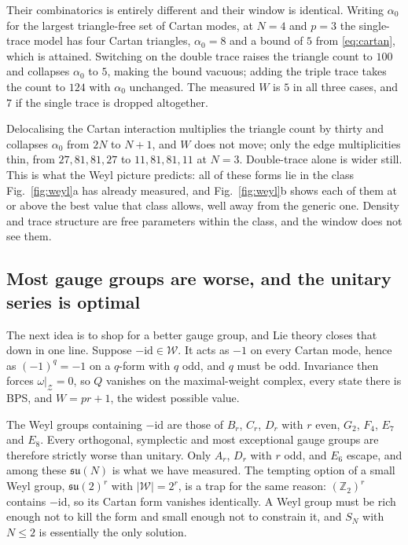\documentclass[10pt]{article}
\newcommand{\su}{\mathfrak{su}}
\newcommand{\Wg}{\mathcal{W}}
\begin{document}
Their combinatorics is entirely different and their window is identical. Writing $\alpha_0$ for the largest
triangle-free set of Cartan modes, at $N=4$ and $p=3$ the single-trace model has four Cartan triangles,
$\alpha_0=8$ and a bound of $5$ from \eqref{eq:cartan}, which is attained. Switching on the double trace raises
the triangle count to $100$ and collapses $\alpha_0$ to $5$, making the bound vacuous; adding the triple trace
takes the count to $124$ with $\alpha_0$ unchanged. The measured $W$ is $5$ in all three cases, and $7$ if the
single trace is dropped altogether.

Delocalising the Cartan interaction multiplies the triangle count by thirty and collapses $\alpha_0$ from $2N$
to $N+1$, and $W$ does not move; only the edge multiplicities thin, from $27,81,81,27$ to $11,81,81,11$ at $N=3$.
Double-trace alone is wider still. This is what the Weyl picture predicts: all of these forms lie in the class
Fig.~\ref{fig:weyl}a has already measured, and Fig.~\ref{fig:weyl}b shows each of them at or above the best value
that class allows, well away from the generic one. Density and trace structure are free parameters within the
class, and the window does not see them.

\subsection{Most gauge groups are worse, and the unitary series is optimal}

The next idea is to shop for a better gauge group, and Lie theory closes that down in one line. Suppose
$-\mathrm{id}\in\Wg$. It acts as $-1$ on every Cartan mode, hence as $(-1)^q=-1$ on a $q$-form with $q$ odd, and
$q$ must be odd. Invariance then forces $\omega|_{\mathcal Z}=0$, so $Q$ vanishes on the maximal-weight complex,
every state there is BPS, and $W=pr+1$, the widest possible value.

The Weyl groups containing $-\mathrm{id}$ are those of $B_r$, $C_r$, $D_r$ with $r$ even, $G_2$, $F_4$, $E_7$ and
$E_8$. Every orthogonal, symplectic and most exceptional gauge groups are therefore strictly worse than unitary.
Only $A_r$, $D_r$ with $r$ odd, and $E_6$ escape, and among these $\su(N)$ is what we have measured. The tempting
option of a small Weyl group, $\su(2)^r$ with $|\Wg|=2^r$, is a trap for the same reason: $(\mathbb Z_2)^r$
contains $-\mathrm{id}$, so its Cartan form vanishes identically. A Weyl group must be rich enough not to kill
the form and small enough not to constrain it, and $S_N$ with $N\le2$ is essentially the only solution.
\end{document}
